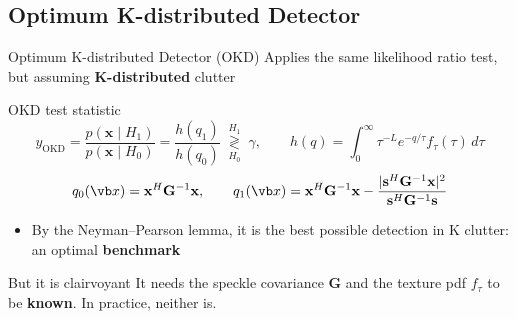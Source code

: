 \documentclass{beamer}
\begin{document}
\subsection{Optimum K-distributed Detector}
\begin{frame}{Optimum K-distributed Detector (OKD) \cite{Gini1998}}
    \small
    Applies the same likelihood ratio test, but assuming \textbf{K-distributed} clutter
    \begin{block}{OKD test statistic}
        \[ y_\text{OKD} = \frac{p(\mathbf{x}\mid H_1)}{p(\mathbf{x}\mid H_0)} = \frac{h(q_1)}{h(q_0)} \;\underset{H_0}{\overset{H_1}{\gtrless}}\; \gamma,
           \qquad h(q) = \int_0^\infty \tau^{-L} e^{-q/\tau} f_\tau(\tau)\,d\tau \]
        \vspace{-1mm}
        \[ q_0(\vb x) = \mathbf{x}^H\mathbf{G}^{-1}\mathbf{x}, \qquad
           q_1(\vb x) = \mathbf{x}^H\mathbf{G}^{-1}\mathbf{x} - \frac{|\mathbf{s}^H\mathbf{G}^{-1}\mathbf{x}|^2}{\mathbf{s}^H\mathbf{G}^{-1}\mathbf{s}}\]
        \vspace{-4mm}
    \end{block}
    \begin{itemize}
        \item By the Neyman--Pearson lemma, it is the best possible detection in K clutter: an optimal \textbf{benchmark}
    \end{itemize}
    \begin{alertblock}{But it is clairvoyant}
        It needs the speckle covariance $\mathbf{G}$ and the texture pdf $f_\tau$ to be \textbf{known}. In practice, neither is.
    \end{alertblock}
\end{frame}
\end{document}
